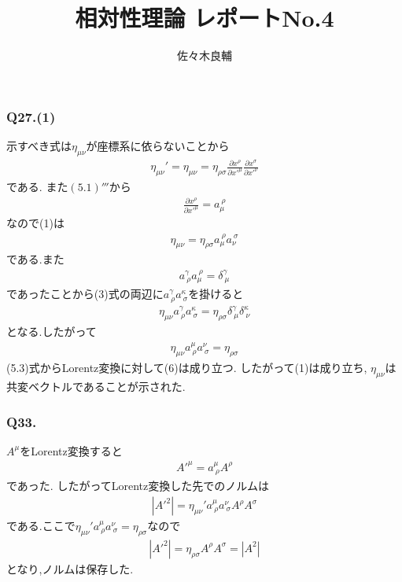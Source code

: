 \documentclass[uplatex,a4j,11pt,dvipdfmx]{jsarticle}
\begin{document}
\title{相対性理論 レポートNo.4}
\author{佐々木良輔}
\date{}
\maketitle
\subsubsection*{Q27.(1)}
示すべき式は$\eta_{\mu\nu}$が座標系に依らないことから
\begin{align}
  \eta_{\mu\nu}'=\eta_{\mu\nu}=\eta_{\rho\sigma}\frac{\partial x^{\rho}}{\partial x'^{\mu}}\frac{\partial x^{\sigma}}{\partial x'^{\nu}}
\end{align}
である.
また$(5.1)'''$から
\begin{align}
  \frac{\partial x^{\rho}}{\partial x'^{\mu}}=a_\mu^{\ \rho}
\end{align}
なので(1)は
\begin{align}
  \eta_{\mu\nu}=\eta_{\rho\sigma}a_\mu^{\ \rho}a_\nu^{\ \sigma}
\end{align}
である.また
\begin{align}
  a^{\gamma}_{\ \rho}a_\mu^{\ \rho}=\delta^{\gamma}_{\ \mu}
\end{align}
であったことから(3)式の両辺に$a^{\gamma}_{\ \rho}a^{\kappa}_{\ \sigma}$を掛けると
\begin{align}
  \eta_{\mu\nu}a^{\gamma}_{\ \rho}a^{\kappa}_{\ \sigma}=\eta_{\rho\sigma}\delta^{\gamma}_{\ \mu}\delta^{\kappa}_{\ \nu}
\end{align}
となる.したがって
\begin{align}
  \eta_{\mu\nu}a^{\mu}_{\ \rho}a^{\nu}_{\ \sigma}=\eta_{\rho\sigma}
\end{align}
(5.3)式からLorentz変換に対して(6)は成り立つ.
したがって(1)は成り立ち,
$\eta_{\mu\nu}$は共変ベクトルであることが示された.
\subsubsection*{Q33.}
$A^\mu$をLorentz変換すると
\begin{align}
  A'^\mu=a^\mu_{\ \rho}A^\rho
\end{align}
であった.
したがってLorentz変換した先でのノルムは
\begin{align}
  |A'^2|=\eta_{\mu\nu}'a^\mu_{\ \rho}a^\nu_{\ \sigma}A^\rho A^\sigma
\end{align}
である.ここで$\eta_{\mu\nu}'a^\mu_{\ \rho}a^\nu_{\ \sigma}=\eta_{\rho\sigma}$なので
\begin{align}
  |A'^2|=\eta_{\rho\sigma}A^\rho A^\sigma=|A^2|
\end{align}
となり,ノルムは保存した.
\end{document}
